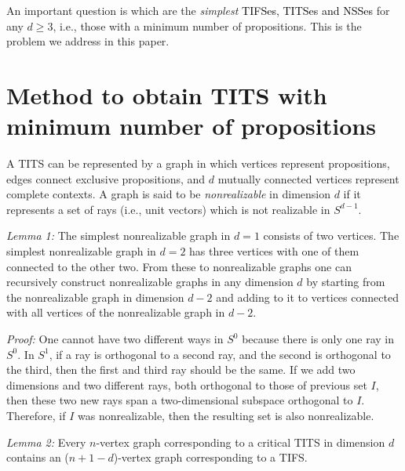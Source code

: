 \documentclass[%
  twocolumn,
 showpacs,
 showkeys,
 preprintnumbers,
 amsmath,amssymb,
 aps,
  pra,
  longbibliography,
 floatfix,
 ]{revtex4-1}
\newcommand{\karl}[1]{\textcolor{black}{#1}}
\def\endproof{ }
\begin{document}
An important question is which are the {\em simplest} \karl{TIFSes, TITSes and NSSes} for any $d \ge 3$, i.e., those with a minimum number of propositions. This is the problem we address in this paper.


\section{Method to obtain TITS with minimum number of propositions}


A TITS can be represented by a graph in which vertices represent propositions, edges connect exclusive propositions, and $d$ mutually connected vertices represent complete contexts. A graph is said to be \emph{nonrealizable} in dimension $d$ if it represents a set of rays (i.e., unit vectors) which is not realizable in $S^{d-1}.$


{\em Lemma 1:} The simplest nonrealizable graph in $d=1$ consists of two vertices. The simplest nonrealizable graph in $d=2$ has three vertices with one of them connected to the other two. From these to nonrealizable graphs one can recursively construct nonrealizable graphs in any dimension $d$ by starting from the nonrealizable graph in dimension $d-2$ and adding to it to vertices connected with all vertices of the nonrealizable graph in $d-2$.


{\em Proof:} One cannot have two different ways in $S^0$ because there is only one ray in $S^0$. In $S^1$, if a ray is orthogonal to a second ray, and the second is orthogonal to the third, then the first and third ray should be the same. If we add two dimensions and two different rays, both orthogonal to those of previous set $I$, then these two new rays span a two-dimensional subspace orthogonal to $I$. Therefore, if $I$ was nonrealizable, then the resulting set is also nonrealizable.\endproof


{\em Lemma 2:} Every $n$-vertex graph corresponding to a critical TITS in dimension $d$ contains an ($n+1-d$)-vertex graph corresponding to a TIFS.
\end{document}
